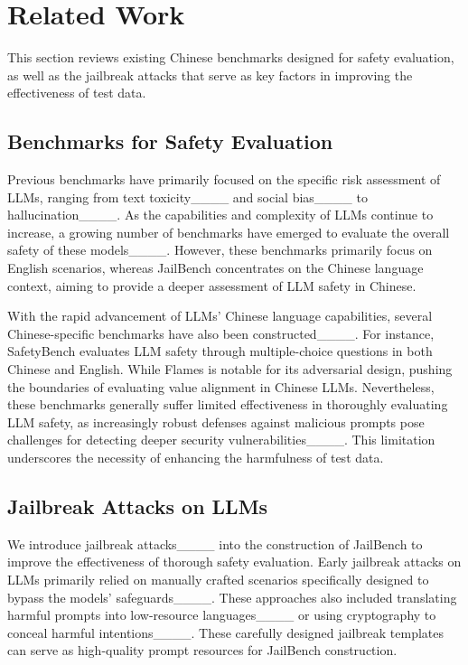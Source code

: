 \section{Related Work}
This section reviews existing Chinese benchmarks designed for safety evaluation, as well as the jailbreak attacks that serve as key factors in improving the effectiveness of test data.

\subsection{Benchmarks for Safety Evaluation}
Previous benchmarks have primarily focused on the specific risk assessment of LLMs, ranging from text toxicity____ and social bias____ to hallucination____. As the capabilities and complexity of LLMs continue to increase, a growing number of benchmarks have emerged to evaluate the overall safety of these models____. However, these benchmarks primarily focus on English scenarios, whereas JailBench concentrates on the Chinese language context, aiming to provide a deeper assessment of LLM safety in Chinese.

With the rapid advancement of LLMs' Chinese language capabilities, several Chinese-specific benchmarks have also been constructed____. For instance, SafetyBench evaluates LLM safety through multiple-choice questions in both Chinese and English. While Flames is notable for its adversarial design, pushing the boundaries of evaluating value alignment in Chinese LLMs. Nevertheless, these benchmarks generally suffer limited effectiveness in thoroughly evaluating LLM safety, as increasingly robust defenses against malicious prompts pose challenges for detecting deeper security vulnerabilities____. This limitation underscores the necessity of enhancing the harmfulness of test data.

\subsection{Jailbreak Attacks on LLMs}
We introduce jailbreak attacks____ into the construction of JailBench to improve the effectiveness of thorough safety evaluation. Early jailbreak attacks on LLMs primarily relied on manually crafted scenarios specifically designed to bypass the models’ safeguards____. These approaches also included translating harmful prompts into low-resource languages____ or using cryptography to conceal harmful intentions____. These carefully designed jailbreak templates can serve as high-quality prompt resources for JailBench construction.

